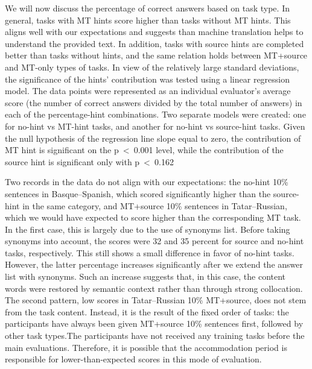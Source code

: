 \documentclass[11pt]{article}
\newcommand{\comment}[1]{}
\begin{document}
We will now discuss the percentage of correct answers based on task type. In general, tasks with MT hints score higher than tasks without MT hints. This aligns well with our expectations and suggests than machine translation helps to understand the provided text. In addition, tasks with source hints are completed better than tasks without hints, and the same relation holds between MT+source and MT-only types of tasks. In view of the relatively large standard deviations, the significance of the hints' contribution was tested using a linear regression model. The data points were represented as an individual evaluator's average score (the number of correct answers divided by the total number of answers) in each of the percentage-hint combinations. Two separate models were created: one for no-hint vs MT-hint tasks, and another for no-hint vs source-hint tasks. Given the null hypothesis of the regression line slope equal to zero, the contribution of MT hint is significant on the p~<~0.001 level, while the contribution of the source hint is significant only with p~<~0.162

Two records in the data do not align with our expectations: the no-hint 10\% sentences in Basque--Spanish, which scored significantly higher than the source-hint in the same category, and MT+source 10\% sentences in Tatar--Russian, which we would have expected to score higher than the corresponding MT task. In the first case, this is largely due to the use of synonyms list. Before taking synonyms into account, the scores were 32 and 35 percent for source and no-hint tasks, respectively. This still shows a small difference in favor of no-hint tasks. However, the latter percentage increases significantly after we extend the answer list with synonyms. Such an increase suggests that, in this case, the content words were restored by 
semantic context rather than through strong collocation. The second pattern, low scores in Tatar--Russian 10\% MT+source, does not stem from the task content. Instead, it is the result of the fixed order of tasks: the participants have always been given MT+source 10\% sentences first, followed by other task types.\comment{MLF: Why? Not random? \cite{oregan13} did random! Why was this changed?}The participants have not received any training tasks before the main evaluations. Therefore, it is possible that the accommodation period is responsible for lower-than-expected scores in this mode of evaluation. 
\end{document}
